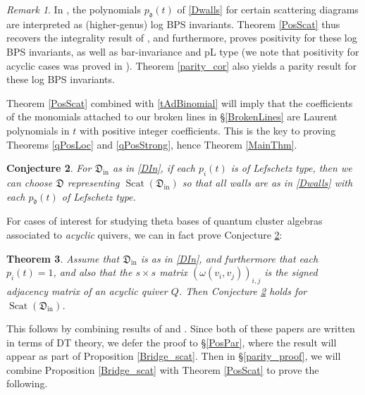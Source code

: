 \documentclass{amsart}
\DeclareMathOperator{\In}{in}
\DeclareMathOperator{\scat}{Scat}
\let\f=\mathfrak
\theoremstyle{plain}%
\newtheorem{thm}{Theorem}[section]
\newtheorem{conj}[thm]{Conjecture}
\theoremstyle{definition}
\theoremstyle{remark}
\newtheorem{rmk}[thm]{Remark}
\begin{document}
\begin{rmk}
In \cite[\S 8]{Bou2}, the polynomials $p_{\f{d}}(t)$ of \eqref{Dwalls} for certain scattering diagrams are interpreted as (higher-genus) log BPS invariants.  Theorem \ref{PosScat} thus recovers the integrality result of \cite[Thm. 33]{Bou2}, and furthermore, proves positivity for these log BPS invariants, as well as bar-invariance and pL type (we note that positivity for acyclic cases was proved in \cite[Prop. 41]{Bou2}).  Theorem \ref{parity_cor} also yields a parity result for these log BPS invariants.  
\end{rmk}


Theorem \ref{PosScat} combined with \eqref{tAdBinomial} will imply that the coefficients of the monomials attached to our broken lines in \S \ref{BrokenLines} are Laurent polynomials in $t$ with positive integer coefficients.  This is the key to proving Theorems \ref{qPosLoc} and \ref{qPosStrong}, hence Theorem \ref{MainThm}.


\begin{conj}\label{Lefschetz_conjecture}
For $\f{D}_{\In}$ as in \eqref{DIn}, if each $p_i(t)$ is of Lefschetz type, then we can choose $\f{D}$ representing $\scat(\f{D}_{\In})$ so that all walls are as in \eqref{Dwalls} with each $p_{\f{d}}(t)$ of Lefschetz type.  
\end{conj}
For cases of interest for studying theta bases of quantum cluster algebras associated to \textit{acyclic} quivers, we can in fact prove Conjecture \ref{Lefschetz_conjecture}:

\begin{thm}
\label{acyclic_scat_thm}
Assume that $\f{D}_{\In}$ is as in \eqref{DIn}, and furthermore that each $p_i(t)=1$, and also that the $s\times s$ matrix $(\omega(v_i,v_j))_{i,j}$ is the signed adjacency matrix of an acyclic quiver $Q$.  Then Conjecture \ref{Lefschetz_conjecture} holds for $\scat(\f{D}_{\In})$.
\end{thm}
This follows by combining results of \cite{Bridge} and \cite{MeiRei}.  Since both of these papers are written in terms of DT theory, we defer the proof to \S \ref{PosPar}, where the result will appear as part of Proposition \ref{Bridge_scat}.  Then in \S \ref{parity_proof}, we will combine Proposition \ref{Bridge_scat} with Theorem \ref{PosScat} to prove the following. 
\end{document}
